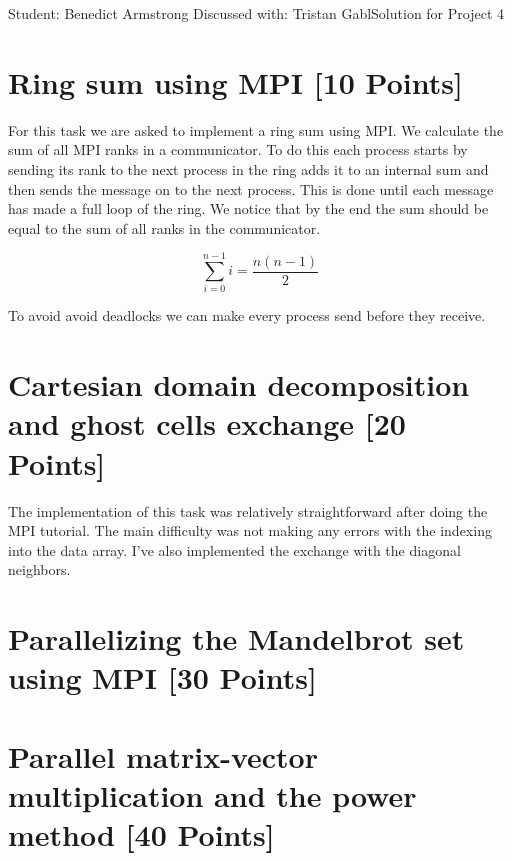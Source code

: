 \documentclass[unicode,11pt,a4paper,oneside,numbers=endperiod,openany]{scrartcl}
\begin{document}
\setassignment
{}

{Student: Benedict Armstrong}
{Discussed with: Tristan Gabl}{Solution for Project 4}{}
\newline


\section{Ring sum using MPI [10 Points]}
For this task we are asked to implement a ring sum using MPI. We calculate the sum of all MPI ranks in a communicator. To do this each process starts by sending its rank to the next process in the ring adds it to an internal sum and then sends the message on to the next process. This is done until each message has made a full loop of the ring. We notice that by the end the sum should be equal to the sum of all ranks in the communicator.

$$
      \sum_{i=0}^{n-1} i = \frac{n(n-1)}{2}
$$


To avoid avoid deadlocks we can make every process send before they receive.


\section{Cartesian domain decomposition and ghost cells exchange [20 Points]}

The implementation of this task was relatively straightforward after doing the MPI tutorial. The main difficulty was not making any errors with the indexing into the data array. I've also implemented the exchange with the diagonal neighbors.

\section{Parallelizing the Mandelbrot set using MPI [30 Points]}

\section{Parallel matrix-vector multiplication and the power method
        [40 Points]}
\end{document}
